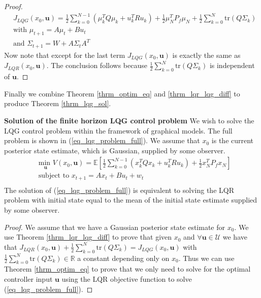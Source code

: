\begin{proof}
\begin{equation}
\begin{aligned}
&J_{LQG}(x_0, \mathbf{u}) = \frac{1}{2}\sum_{k=0}^{N-1} \left( \mu_k^TQ\mu_k + u_k^TRu_k \right) + \frac{1}{2}\mu_N^TP_f\mu_N + \frac{1}{2}\sum_{k=0}^N \text{tr}(Q\Sigma_k) \\
&\text{with } \mu_{t+1} = A\mu_t +Bu_t \\
&\text{and } \Sigma_{t+1} = W+A\Sigma_t A^T 
\end{aligned}
\label{eq_simpl_obj_func}
\end{equation}
Now note that except for the last term $J_{LQG}(x_0, \mathbf{u})$ is exactly the same as $J_{LQR}(x_0, \mathbf{u})$. The conclusion follows because $\frac{1}{2}\sum_{k=0}^N \text{tr}(Q\Sigma_k)$ is independent of $\mathbf{u}$. 
\end{proof}
Finally we combine Theorem \ref{thrm_optim_eq} and \ref{thrm_lqr_lqg_diff} to produce Theorem \ref{thrm_lqg_sol}.
\begin{thrm}
\textbf{Solution of the finite horizon LQG control problem} We wish to solve the LQG control problem within the framework of graphical models. The full problem is shown in (\ref{eq_lqg_problem_full}). We assume that $x_0$ is the current posterior state estimate, which is Gaussian, supplied by some observer.
\begin{equation}
\begin{aligned}
&\underset{\mathbf{u}}{\text{min }} V(x_0, \mathbf{u}) = \mathbb{E}\left[ \frac{1}{2}\sum_{k=0}^{N-1} \left( x_k^TQx_k + u_k^TRu_k \right) + \frac{1}{2}x_N^TP_fx_N \right] \\
& \text{subject to } x_{t+1}=Ax_t+Bu_t + w_t\\
\end{aligned}
\label{eq_lqg_problem_full}
\end{equation}
The solution of (\ref{eq_lqg_problem_full}) is equivalent to solving the LQR problem with initial state equal to the mean of the initial state estimate supplied by some observer.
\label{thrm_lqg_sol}
\end{thrm}
\begin{proof}
We assume that we have a Gaussian posterior state estimate for $x_0$. We use Theorem \ref{thrm_lqr_lqg_diff} to prove that given $x_0$ and $\forall \mathbf{u} \in \mathcal{U}$ we have that $J_{LQR}(x_0, \mathbf{u}) + \frac{1}{2}\sum_{k=0}^N \text{tr}(Q\Sigma_k) = J_{LQG}(x_0, \mathbf{u})$ with $\frac{1}{2}\sum_{k=0}^N \text{tr}(Q\Sigma_k) \in \mathbb{R}$ a constant depending only on $x_0$. Thus we can use Theorem \ref{thrm_optim_eq} to prove that we only need to solve for the optimal controller input $\mathbf{u}$ using the LQR objective function to solve (\ref{eq_lqg_problem_full}). 
\end{proof}

